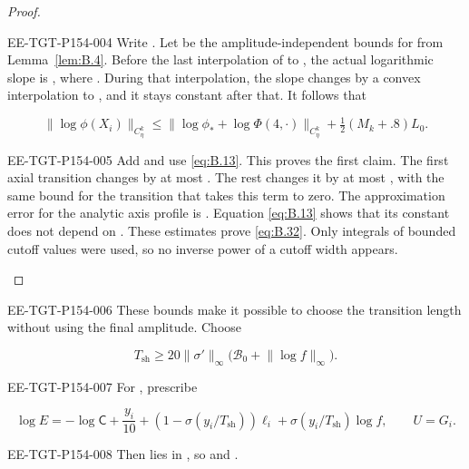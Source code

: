 \begin{proof}
\begin{EESegment}{EE-TGT-P154-004}
Write . Let  be the
amplitude-independent bounds for  from
Lemma~\ref{lem:B.4}. Before the last interpolation of  to
, the actual logarithmic slope is
, where
. During that interpolation, the slope changes by a convex
interpolation to , and it stays constant after that. It follows that
\end{EESegment}
\[
  \lVert\log\phi(X_i)\rVert_{C_\eta^k}
  \leq\lVert\log\phi_*+\log\Phi(4,\mathord\cdot)\rVert_{C_\eta^k}
  +\tfrac12(M_k+.8)L_0.
\]
\begin{EESegment}{EE-TGT-P154-005}
Add  and use \eqref{eq:B.13}. This proves the first
claim. The first axial transition changes  by at most
. The rest changes it by at most
, with the same bound for the transition that takes this term
to zero. The approximation error for the analytic axis profile is
. Equation \eqref{eq:B.13} shows that its constant
does not depend on . These estimates prove \eqref{eq:B.32}. Only
integrals of bounded cutoff values were used, so no inverse power of a cutoff width appears.
\end{EESegment}
\end{proof}

\begin{EESegment}{EE-TGT-P154-006}
These bounds make it possible to choose the transition length without using the final amplitude.
Choose
\end{EESegment}
\begin{equation}
  T_{\mathrm{sh}}\geq20\lVert\sigma'\rVert_\infty
  \bigl(\mathcal B_0+\lVert\log f\rVert_\infty\bigr).
\tag{B.33}\label{eq:B.33}
\end{equation}
\begin{EESegment}{EE-TGT-P154-007}
For , prescribe
\end{EESegment}
\begin{equation}
  \log E=-\log\mathsf C+\frac{y_i}{10}
  +(1-\sigma(y_i/T_{\mathrm{sh}}))\ell_i
  +\sigma(y_i/T_{\mathrm{sh}})\log f,
  \qquad U=G_i.
\tag{B.34}\label{eq:B.34}
\end{equation}
\begin{EESegment}{EE-TGT-P154-008}
Then 
lies in , so  and
.
\end{EESegment}

